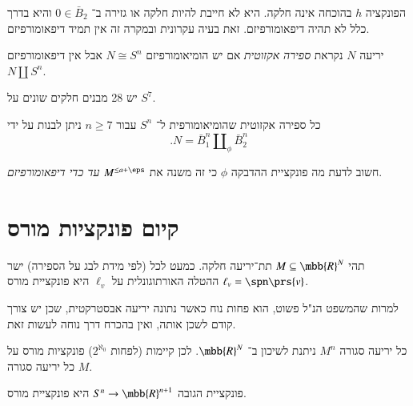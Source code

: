 \documentclass[a4paper,10pt,twoside,openany]{book}
\begin{document}
\begin{remark}
הפונקציה
$h$
בהוכחה אינה חלקה. היא לא חייבת להיות חלקה או גזירה ב־%
$0 \in \bar{B}_2$
והיא בדרך כלל לא תהיה דיפאומורפיזם.
זאת בעיה עקרונית ובמקרה זה אין תמיד דיפאומורפיזם.
\end{remark}

\begin{definition}
יריעה
$N$
נקראת
\emph{ספירה אקזוטית}
אם יש הומיאומורפיזם
$N \cong S^n$
אבל אין דיפאומורפיזם
$N \amalg S^n$.
\end{definition}

\begin{fact}[מילנור]
יש 28 מבנים חלקים שונים על
$S^7$.
\end{fact}

\begin{fact}
כל ספירה אקזוטית שהומיאומורפית ל־%
$S^n$
עבור
$n \geq 7$
ניתן לבנות על ידי
\[\text{.} N = \bar{B}^n_1 \amalg_\phi \bar{B}_2^n\]
\end{fact}

\begin{remark}
חשוב לדעת מה פונקציית ההדבקה
$\phi$
כי זה משנה את
$M^{\leq a + \eps}$
\emph{עד כדי דיפאומורפיזם}.
\end{remark}

\section{קיום פונקציות מורס}

\begin{theorem}
תהי
$M \subseteq \mbb{R}^N$
תת־יריעה חלקה.
כמעט לכל (לפי מידת לבג על הספירה) ישר
$\ell_v = \spn\prs{v}$
ההטלה האורתוגונלית על
$\ell_v$
היא פונקציית מורס.
\end{theorem}

\begin{remark}
למרות שהמשפט הנ"ל פשוט, הוא פחות נוח כאשר נתונה יריעה אבסטרקטית, שכן יש צורך קודם לשכן אותה, ואין בהכרח דרך נוחה לעשות זאת.
\end{remark}

\begin{corollary}
כל יריעה סגורה
$M^n$
ניתנת לשיכון ב־%
$\mbb{R}^N$.
לכן קיימות
(לפחות
$2^{\aleph_0}$)
פונקציות מורס על כל יריעה סגורה
$M$.
\end{corollary}

\begin{corollary}
פונקציית הגובה
$S^n \to \mbb{R}^{n+1}$
היא פונקציית מורס.
\end{corollary}
\end{document}
